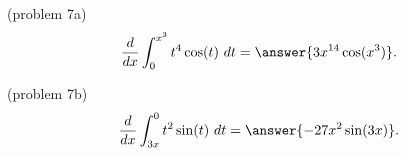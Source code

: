 \documentclass{ximera}
\begin{document}
\begin{problem}(problem 7a)
\[\frac{d}{dx} \int_0^{x^3} t^4\cos(t) \ dt = \answer{3x^{14}\cos(x^3)}.\]
\end{problem}

\begin{problem}(problem 7b)
\[\frac{d}{dx} \int_{3x}^0 t^2\sin(t) \ dt = \answer{-27x^2\sin(3x)}.\]
\end{problem}


\begin{center}
\begin{foldable}
\end{foldable}
\end{center}
\end{document}
